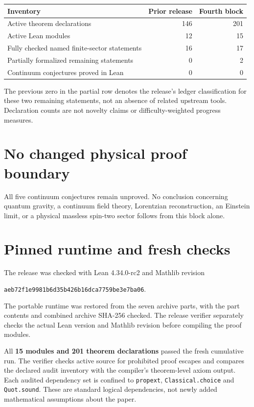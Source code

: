 \documentclass[10pt,letterpaper]{article}
\newcommand{\pageheading}[2]{\vspace*{2pt}{\small\color{ink}\textsc{#1}}\par\vspace{2pt}{\Large\bfseries #2}\par\vspace{4pt}}
\begin{document}
\begin{center}
\renewcommand{\arraystretch}{1.25}
\begin{tabularx}{\linewidth}{@{}Xrr@{}}
\toprule
Inventory & Prior release & Fourth block\\
\midrule
Active theorem declarations & 146 & 201\\
Active Lean modules & 12 & 15\\
Fully checked named finite-sector statements & 16 & 17\\
Partially formalized remaining statements & 0 & 2\\
Continuum conjectures proved in Lean & 0 & 0\\
\bottomrule
\end{tabularx}
\end{center}
The previous zero in the partial row denotes the release's ledger classification for these two remaining statements, not an absence of related upstream tools. Declaration counts are not novelty claims or difficulty-weighted progress measures.

\section*{No changed physical proof boundary}
All five continuum conjectures remain unproved. No conclusion concerning quantum gravity, a continuum field theory, Lorentzian reconstruction, an Einstein limit, or a physical massless spin-two sector follows from this block alone.

\newpage
\pageheading{Reproducibility and trust}{What the executable evidence establishes}
\section*{Pinned runtime and fresh checks}
The release was checked with Lean 4.34.0-rc2 and Mathlib revision
\begin{center}
\texttt{aeb72f1e9981b6d35b426b16dca7759be3e7ba06}.
\end{center}
The portable runtime was restored from the seven archive parts, with the part contents and combined archive SHA-256 checked. The release verifier separately checks the actual Lean version and Mathlib revision before compiling the proof modules.

All \textbf{15 modules and 201 theorem declarations} passed the fresh cumulative run. The verifier checks active source for prohibited proof escapes and compares the declared audit inventory with the compiler's theorem-level axiom output. Each audited dependency set is confined to \texttt{propext}, \texttt{Classical.choice} and \texttt{Quot.sound}. These are standard logical dependencies, not newly added mathematical assumptions about the paper.
\end{document}
